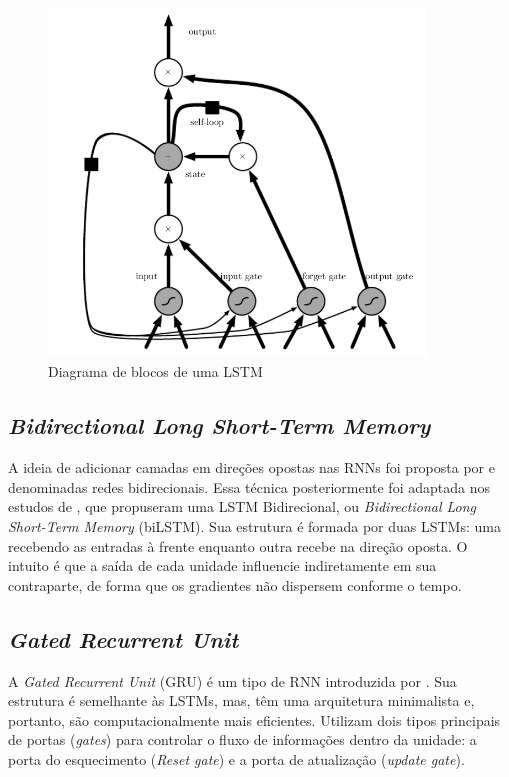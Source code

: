 \begin{figure}[!htb] \centering
  \caption{Diagrama de blocos de uma LSTM} \label{figura:lstm}
  \begin{varwidth}{\linewidth}
    \includegraphics[width=10cm]{figuras/lstm.png}
  \end{varwidth}
\end{figure}

\subsection{\textit{Bidirectional Long Short-Term Memory}} \label{sec:bilstm}

A ideia de adicionar camadas em direções opostas nas RNNs foi proposta por \textcite{Schuster} e denominadas redes bidirecionais.
Essa técnica posteriormente foi adaptada nos estudos de \textcite{bilstm}, que propuseram uma LSTM Bidirecional, ou \textit{Bidirectional Long Short-Term Memory} (biLSTM).
Sua estrutura é formada por duas LSTMs: 
uma recebendo as entradas à frente enquanto outra recebe na direção oposta.
O intuito é que a saída de cada unidade influencie indiretamente em sua contraparte, de forma que os gradientes não dispersem conforme o tempo.


\subsection{\textit{Gated Recurrent Unit}} \label{sec:gru}
A \textit{Gated Recurrent Unit} (GRU) é um tipo de RNN introduzida por \textcite{Cho}.
Sua estrutura é semelhante às LSTMs, mas, têm uma arquitetura minimalista e, portanto, são computacionalmente mais eficientes. 
Utilizam dois tipos principais de portas (\textit{gates}) para controlar o fluxo de informações dentro da unidade: a porta do esquecimento (\textit{Reset gate}) e a porta de atualização (\textit{update gate}).

